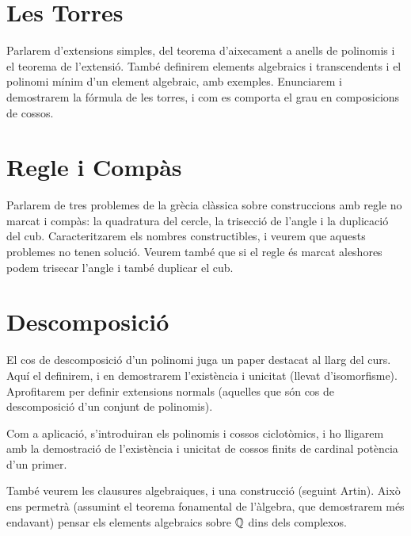 \documentclass[
]{book}
\theoremstyle{definition}
\theoremstyle{definition}
\theoremstyle{definition}
\theoremstyle{definition}
\theoremstyle{remark}
\begin{document}
\hypertarget{les-torres}{%
\chapter{Les Torres}\label{les-torres}}

Parlarem d'extensions simples, del teorema d'aixecament a anells de polinomis i el teorema de l'extensió.
També definirem elements algebraics i transcendents i el polinomi mínim d'un element algebraic, amb exemples.
Enunciarem i demostrarem la fórmula de les torres, i com es comporta el grau en composicions de cossos.

\hypertarget{section}{%
\section{}\label{section}}

\hypertarget{regle-i-compuxe0s}{%
\chapter{Regle i Compàs}\label{regle-i-compuxe0s}}

Parlarem de tres problemes de la grècia clàssica sobre construccions amb regle no marcat i compàs: la quadratura del cercle,
la trisecció de l'angle i la duplicació del cub. Caracteritzarem els nombres constructibles, i veurem que aquests problemes
no tenen solució. Veurem també que si el regle és marcat aleshores podem trisecar l'angle i també duplicar el cub.

\hypertarget{descomposiciuxf3}{%
\chapter{Descomposició}\label{descomposiciuxf3}}

El cos de descomposició d'un polinomi juga un paper destacat al llarg del curs.
Aquí el definirem, i en demostrarem l'existència i unicitat (llevat d'isomorfisme).
Aprofitarem per definir extensions normals (aquelles que són cos de descomposició d'un conjunt de polinomis).

Com a aplicació, s'introduiran els polinomis i cossos ciclotòmics, i ho lligarem amb la
demostració de l'existència i unicitat de cossos finits de cardinal potència d'un primer.

També veurem les clausures algebraiques, i una construcció (seguint Artin). Això ens permetrà (assumint el teorema fonamental
de l'àlgebra, que demostrarem més endavant) pensar els elements algebraics sobre \(\mathbb{Q}\) dins dels complexos.
\end{document}

